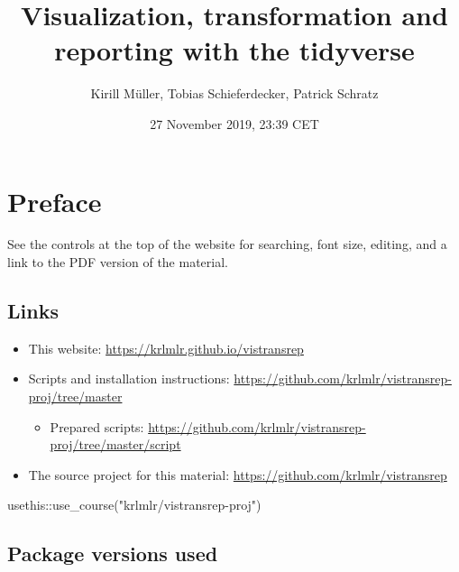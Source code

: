 \documentclass[]{book}
\title{Visualization, transformation and reporting with the tidyverse}
\author{Kirill Müller, Tobias Schieferdecker, Patrick Schratz}
\date{27 November 2019, 23:39 CET}
\newenvironment{Shaded}{}{}
\newcommand{\KeywordTok}[1]{\textcolor[rgb]{0.00,0.00,1.00}{#1}}
\newcommand{\NormalTok}[1]{#1}
\newcommand{\OperatorTok}[1]{#1}
\newcommand{\StringTok}[1]{\textcolor[rgb]{0.00,0.50,0.50}{#1}}
\providecommand{\tightlist}{%
  \setlength{\itemsep}{0pt}\setlength{\parskip}{0pt}}
\begin{document}
\maketitle

{
\setcounter{tocdepth}{1}
\tableofcontents
}
\hypertarget{preface}{%
\chapter*{Preface}\label{preface}}

See the controls at the top of the website for searching, font size, editing, and a link to the PDF version of the material.

\hypertarget{links}{%
\section*{Links}\label{links}}

\begin{itemize}
\item
  This website: \url{https://krlmlr.github.io/vistransrep}
\item
  Scripts and installation instructions: \url{https://github.com/krlmlr/vistransrep-proj/tree/master}

  \begin{itemize}
  \tightlist
  \item
    Prepared scripts: \url{https://github.com/krlmlr/vistransrep-proj/tree/master/script}
  \end{itemize}
\item
  The source project for this material: \url{https://github.com/krlmlr/vistransrep}
\end{itemize}

\begin{Shaded}
\begin{Highlighting}[]
\NormalTok{usethis}\OperatorTok{::}\KeywordTok{use_course}\NormalTok{(}\StringTok{"krlmlr/vistransrep-proj"}\NormalTok{)}
\end{Highlighting}
\end{Shaded}

\hypertarget{package-versions-used}{%
\section*{Package versions used}\label{package-versions-used}}
\end{document}

